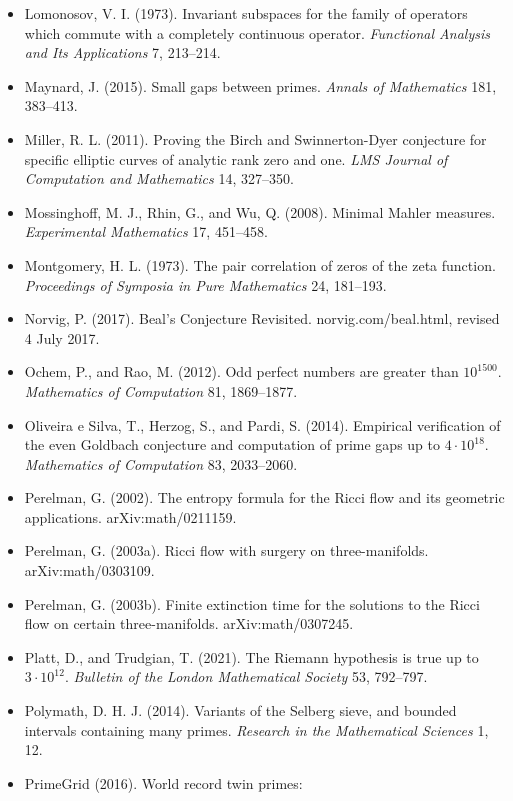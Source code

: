 \documentclass[10pt]{article}
\begin{document}
\begin{itemize}
  \emph{Memoirs of the American Mathematical Society} 166, no. 790.
\item
  Lomonosov, V. I. (1973). Invariant subspaces for the family of
  operators which commute with a completely continuous operator.
  \emph{Functional Analysis and Its Applications} 7, 213--214.
\item
  Maynard, J. (2015). Small gaps between primes. \emph{Annals of
  Mathematics} 181, 383--413.
\item
  Miller, R. L. (2011). Proving the Birch and Swinnerton-Dyer conjecture
  for specific elliptic curves of analytic rank zero and one. \emph{LMS
  Journal of Computation and Mathematics} 14, 327--350.
\item
  Mossinghoff, M. J., Rhin, G., and Wu, Q. (2008). Minimal Mahler
  measures. \emph{Experimental Mathematics} 17, 451--458.
\item
  Montgomery, H. L. (1973). The pair correlation of zeros of the zeta
  function. \emph{Proceedings of Symposia in Pure Mathematics} 24,
  181--193.
\item
  Norvig, P. (2017). Beal's Conjecture Revisited. norvig.com/beal.html,
  revised 4 July 2017.
\item
  Ochem, P., and Rao, M. (2012). Odd perfect numbers are greater than
  \(10^{1500}\). \emph{Mathematics of Computation} 81, 1869--1877.
\item
  Oliveira e Silva, T., Herzog, S., and Pardi, S. (2014). Empirical
  verification of the even Goldbach conjecture and computation of prime
  gaps up to \(4 \cdot 10^{18}\). \emph{Mathematics of Computation} 83,
  2033--2060.
\item
  Perelman, G. (2002). The entropy formula for the Ricci flow and its
  geometric applications. arXiv:math/0211159.
\item
  Perelman, G. (2003a). Ricci flow with surgery on three-manifolds.
  arXiv:math/0303109.
\item
  Perelman, G. (2003b). Finite extinction time for the solutions to the
  Ricci flow on certain three-manifolds. arXiv:math/0307245.
\item
  Platt, D., and Trudgian, T. (2021). The Riemann hypothesis is true up
  to \(3 \cdot 10^{12}\). \emph{Bulletin of the London Mathematical
  Society} 53, 792--797.
\item
  Polymath, D. H. J. (2014). Variants of the Selberg sieve, and bounded
  intervals containing many primes. \emph{Research in the Mathematical
  Sciences} 1, 12.
\item
  PrimeGrid (2016). World record twin primes:

\end{itemize}
\end{document}
